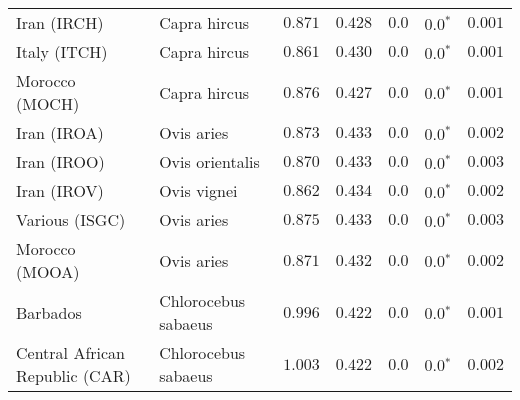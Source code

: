 \begin{center}
\begin{adjustbox}{width = 1\textwidth}
\begin{tabular}{|l|l|r|r|r|r|r|}
                    Iran (IRCH) &         Capra hircus &                                           $ 0.871$ &                                           $ 0.428$ &            $0.0$ &                  $\bm{0.0{^*}}$ &           $ 0.001$ \\
                   Italy (ITCH) &         Capra hircus &                                           $ 0.861$ &                                           $ 0.430$ &            $0.0$ &                  $\bm{0.0{^*}}$ &           $ 0.001$ \\
                 Morocco (MOCH) &         Capra hircus &                                           $ 0.876$ &                                           $ 0.427$ &            $0.0$ &                  $\bm{0.0{^*}}$ &           $ 0.001$ \\
                    Iran (IROA) &           Ovis aries &                                           $ 0.873$ &                                           $ 0.433$ &            $0.0$ &                  $\bm{0.0{^*}}$ &           $ 0.002$ \\
                    Iran (IROO) &      Ovis orientalis &                                           $ 0.870$ &                                           $ 0.433$ &            $0.0$ &                  $\bm{0.0{^*}}$ &           $ 0.003$ \\
                    Iran (IROV) &          Ovis vignei &                                           $ 0.862$ &                                           $ 0.434$ &            $0.0$ &                  $\bm{0.0{^*}}$ &           $ 0.002$ \\
                 Various (ISGC) &           Ovis aries &                                           $ 0.875$ &                                           $ 0.433$ &            $0.0$ &                  $\bm{0.0{^*}}$ &           $ 0.003$ \\
                 Morocco (MOOA) &           Ovis aries &                                           $ 0.871$ &                                           $ 0.432$ &            $0.0$ &                  $\bm{0.0{^*}}$ &           $ 0.002$ \\
                       Barbados &  Chlorocebus sabaeus &                                           $ 0.996$ &                                           $ 0.422$ &            $0.0$ &                  $\bm{0.0{^*}}$ &           $ 0.001$ \\
 Central African Republic (CAR) &  Chlorocebus sabaeus &                                           $ 1.003$ &                                           $ 0.422$ &            $0.0$ &                  $\bm{0.0{^*}}$ &           $ 0.002$ \\

\end{tabular}
\end{adjustbox}
\end{center}
